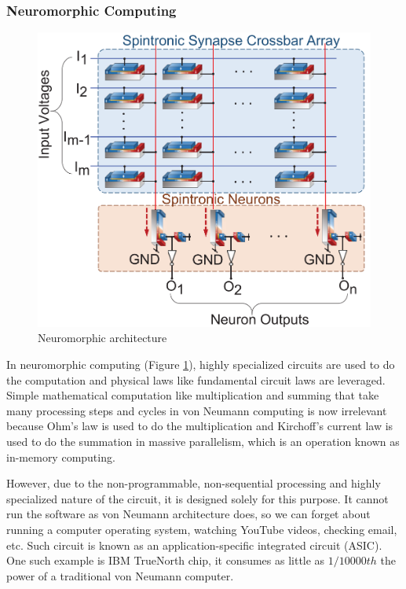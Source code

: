 \subsubsection{Neuromorphic Computing}
\begin{figure}[H]
	\centering
	\includegraphics[scale=0.4]{neuromorphic.png}
	\caption{Neuromorphic architecture}
	\label{fig:neuromorphic}
\end{figure}
In neuromorphic computing (Figure \ref{fig:neuromorphic}), highly specialized circuits are used to do the computation and physical laws like fundamental circuit laws are leveraged. Simple mathematical computation like multiplication and summing that take many processing steps and cycles in von Neumann computing is now irrelevant because Ohm's law is used to do the multiplication and Kirchoff's current law is used to do the summation in massive parallelism, which is an operation known as in-memory computing.

However, due to the non-programmable, non-sequential processing and highly specialized nature of the circuit, it is designed solely for this purpose. It cannot run the software as von Neumann architecture does, so we can forget about running a computer operating system, watching YouTube videos, checking email, etc. Such circuit is known as an application-specific integrated circuit (ASIC). One such example is IBM TrueNorth chip, it consumes as little as $1/10000th$ the power of a traditional von Neumann computer.

